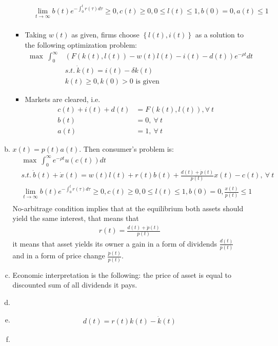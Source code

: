 \documentclass[a4paper]{article}
\begin{document}
\begin{enumerate}[1.]
\begin{enumerate}[(a)]
\begin{itemize}
\begin{align*}
			&\lim_{t \to \infty} b(t)e^{-\int_{0}^t r(\tau)d\tau} \ge 0, c(t) \ge 0, 0 \le l(t) \le 1, b(0) = 0, a(t) \le 1\\
			\end{align*}
			\item Taking $w(t)$ as given, firms choose $\left\{l(t), i(t)\right\}$ as a solution to the following optimization problem:
			\begin{align*}
			\max\ \int_{0}^{\infty} &(F(k(t), l(t)) - w(t)l(t) - i(t) - d(t))e^{-\rho t}dt\\
			&s.t.\ \dot{k}(t) = i(t) - \delta k(t)\\
			&k(t) \ge 0, k(0) > 0 \text{ is given}
			\end{align*}
			\item Markets are cleared, i.e.
			\begin{align*}
			c(t) + i(t) + d(t)&= F(k(t), l(t)), \forall\ t\\
			b(t) &= 0,\ \forall\ t\\
			a(t) &= 1,\ \forall\ t
			\end{align*}
		\end{itemize}
	\item $x(t) = p(t)a(t)$. Then consumer's problem is:
	\begin{align*}
	&\max\ \int_{0}^{\infty} e^{-\rho t}u(c(t))dt\\
	&s.t.\ \dot{b}(t) + \dot{x}(t) = w(t)l(t) + r(t)b(t) + \frac{d(t) + \dot{p}(t)}{p(t)}x(t) - c(t),\ \forall\ t\\
	&\lim_{t \to \infty} b(t)e^{-\int_{0}^t r(\tau)d\tau} \ge 0, c(t) \ge 0, 0 \le l(t) \le 1, b(0) = 0, \frac{x(t)}{p(t)} \le 1\\
	\end{align*}
	No-arbitrage condition implies that at the equilibrium both assets should yield the same interest, that means that
	\begin{align*}
	r(t) = \frac{d(t) + \dot{p}(t)}{p(t)}
	\end{align*}
	it means that asset yields its owner a gain in a form of dividends $\frac{d(t)}{p(t)}$ and in a form of price change $\frac{\dot{p}(t)}{p(t)}$.
	\item Economic interpretation is the following: the price of asset is equal to discounted sum of all dividends it pays.
	\item 
	\item \begin{align*}
	d(t) = r(t)k(t) - \dot{k}(t)
	\end{align*}
	\item
	\end{enumerate}
\end{enumerate}
\end{document}
